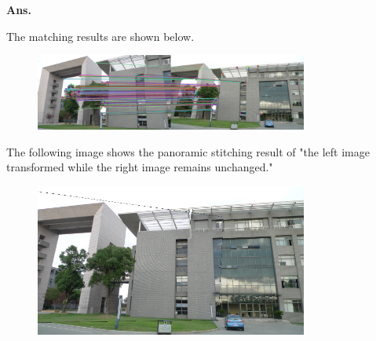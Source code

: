 \documentclass[12pt, a4paper, UTF8, fontset=windows]{ctexbook}
\newenvironment{solution}{\par\noindent\textbf{Ans.}}{\par}
\begin{document}
\begin{solution}

    The matching results are shown below.

    \begin{figure}[H]
        \centering
        \includegraphics[width=0.8\textwidth]{../code/Q6/images/result/image_matches.png}
        \label{fig:Q6_1}
    \end{figure}

    The following image shows the panoramic stitching result of "the left image transformed while the right image remains unchanged."

    \begin{figure}[H]
        \centering
        \includegraphics[width=0.8\textwidth]{../code/Q6/images/result/homograyphy.png}
        \label{fig:Q6_2}
    \end{figure}

\end{solution} 
\end{document}
